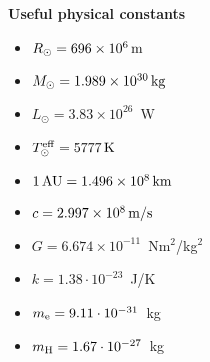 \documentclass[12pt]{article}
\begin{document}
{\bf Useful physical constants}
\begin{itemize}
  \item $R_{\odot} = 696 \times 10^6\,{\rm m}$
  \item $M_{\odot} = 1.989 \times 10^{30}\,{\rm kg}$
  \item $L_{\odot} = 3.83 \times 10^{26}$~W
  \item $T^{\rm eff}_{\odot} = 5777\,{\rm K}$
  \item $1\,{\rm AU} = 1.496 \times 10^8\,{\rm km}$
  \item $c = 2.997 \times 10^8\,{\rm m/s}$
  \item $G = 6.674 \times 10^{-11}$~Nm$^2$/kg$^2$
  \item $k = 1.38\cdot10^{-23}$~J/K
  \item $m_{\rm e} = 9.11\cdot10^{-31}$~kg
  \item $m_{\rm H} = 1.67\cdot10^{-27}$~kg
\end{itemize}
\end{document}
